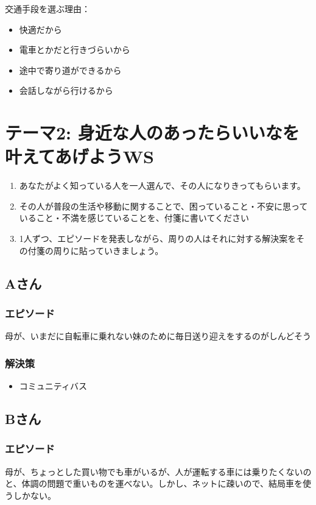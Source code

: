 \documentclass[a4paper,12pt, uplatex]{jsbook}
\begin{document}
交通手段を選ぶ理由：
\begin{itemize}
  \item 快適だから
  \item 電車とかだと行きづらいから
  \item 途中で寄り道ができるから
  \item 会話しながら行けるから
\end{itemize}


\section{テーマ2: 身近な人のあったらいいなを叶えてあげようWS}
\begin{enumerate}
  \item あなたがよく知っている人を一人選んで、その人になりきってもらいます。
  \item その人が普段の生活や移動に関することで、困っていること・不安に思っていること・不満を感じていることを、付箋に書いてください
  \item 1人ずつ、エピソードを発表しながら、周りの人はそれに対する解決案をその付箋の周りに貼っていきましょう。
\end{enumerate}


\subsection{Aさん}
\subsubsection{エピソード}
母が、いまだに自転車に乗れない妹のために毎日送り迎えをするのがしんどそう

\subsubsection{解決策}
\begin{itemize}
  \item コミュニティバス
\end{itemize}


\subsection{Bさん}
\subsubsection{エピソード}
母が、ちょっとした買い物でも車がいるが、人が運転する車には乗りたくないのと、体調の問題で重いものを運べない。しかし、ネットに疎いので、結局車を使うしかない。
\end{document}
